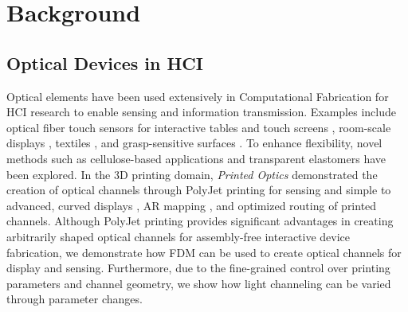 \section{Background}


\subsection{Optical Devices in HCI}
Optical elements have been used extensively in Computational Fabrication for HCI research to enable sensing and information transmission. Examples include optical fiber touch sensors 
for interactive tables \cite{go2012object} and touch screens \cite{holz2013fiberio}, room-scale displays \cite{swaminathan2020optistructures}, textiles \cite{olwal2018braid, hashimoto2013lightcloth}, and grasp-sensitive surfaces \cite{wimmer2010flyeye}. To enhance flexibility, novel methods such as cellulose-based applications \cite{guridi2023light} and transparent elastomers \cite{yao2014integrating} have been explored. In the 3D printing domain, \textit{Printed Optics} \cite{printed_optics_2012} demonstrated the creation of optical channels through PolyJet printing for sensing and simple to advanced, curved displays \cite{brockmeyer2013papillon}, AR mapping \cite{fibar_2020}, and optimized routing \cite{clr_printed_optical_fibers_2014} of printed channels.
Although PolyJet printing provides significant advantages in creating arbitrarily shaped optical channels for assembly-free interactive device fabrication,
we demonstrate how FDM can be used to create optical channels for display and sensing. Furthermore, due to the fine-grained control over printing parameters and channel geometry, we show how light channeling can be varied through parameter changes. %


